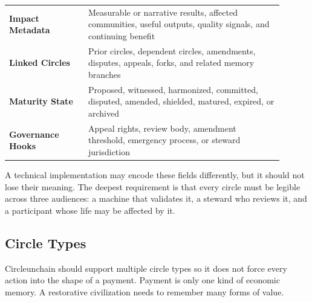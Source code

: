 \documentclass[12pt]{article}
\begin{document}
\begin{longtable}{>{\bfseries}p{0.26\linewidth}p{0.64\linewidth}}
Impact Metadata & Measurable or narrative results, affected communities, useful outputs, quality signals, and continuing benefit \\
Linked Circles & Prior circles, dependent circles, amendments, disputes, appeals, forks, and related memory branches \\
Maturity State & Proposed, witnessed, harmonized, committed, disputed, amended, shielded, matured, expired, or archived \\
Governance Hooks & Appeal rights, review body, amendment threshold, emergency process, or steward jurisdiction \\
\bottomrule
\end{longtable}

A technical implementation may encode these fields differently, but it should not lose their meaning. The deepest requirement is that every circle must be legible across three audiences: a machine that validates it, a steward who reviews it, and a participant whose life may be affected by it.

\subsection{Circle Types}

Circleunchain should support multiple circle types so it does not force every action into the shape of a payment. Payment is only one kind of economic memory. A restorative civilization needs to remember many forms of value.
\end{document}

